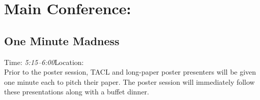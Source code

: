 \chapter{Main Conference: \daydate}
\thispagestyle{emptyheader}

\newpage






\clearpage
\section{One Minute Madness}
{\large Time: \emph{5:15--6:00}\hfill Location: \OneLoc}\\

Prior to the poster session, TACL and long-paper poster presenters
will be given one minute each to pitch their paper. The poster session
will immediately follow these presentations along with a buffet
dinner.









